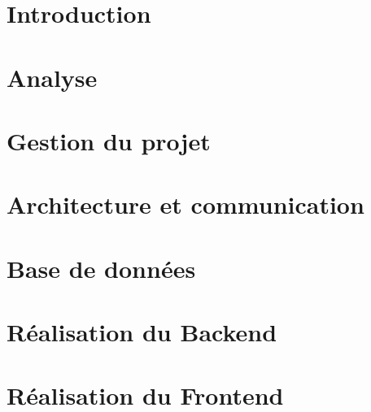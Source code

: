 \documentclass[
    iict, %
    il, %
]{heig-tb}
\begin{document}
\maketitle
\frontmatter
\clearemptydoublepage

\preamble
\authentification

\begin{abstract}
    
\end{abstract}

\clearemptydoublepage
{
    \tableofcontents
    \let\cleardoublepage\clearpage
    \listoffigures
    \let\cleardoublepage\clearpage
    \listoftables
    \let\cleardoublepage\clearpage
    \listoflistings
}

\printnomenclature
\clearemptydoublepage
{}

\mainmatter
\chapter{Introduction}


\chapter{Analyse}


\chapter{Gestion du projet}


\chapter{Architecture et communication}


\chapter{Base de données}


\chapter{Réalisation du Backend}


\chapter{Réalisation du Frontend}

\end{document}
